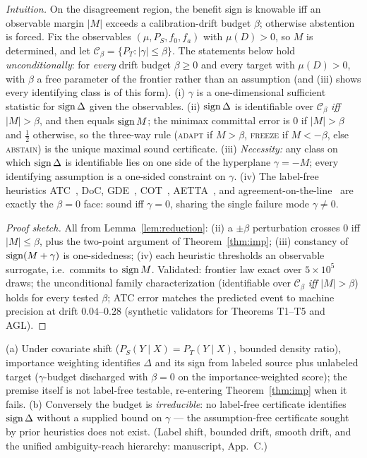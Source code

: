 \begin{theorem}\label{thm:frontier}
\emph{Intuition.} On the disagreement region, the benefit sign is knowable iff an observable
margin $|M|$ exceeds a calibration-drift budget $\beta$; otherwise abstention is forced.
Fix the observables $(\mu,P_S,f_0,f_a)$ with $\mu(D)>0$, so $M$ is determined, and let
$\mathcal C_\beta=\{P_T:|\gamma|\le\beta\}$. The statements below hold \emph{unconditionally}:
for \emph{every} drift budget $\beta\ge0$ and every target with $\mu(D)>0$, with $\beta$ a free
parameter of the frontier rather than an assumption (and (iii) shows every identifying class is
of this form).
\textnormal{(i)} $\gamma$ is a one-dimensional sufficient statistic for $\operatorname{sign}\Delta$
given the observables.
\textnormal{(ii)} $\operatorname{sign}\Delta$ is identifiable over $\mathcal C_\beta$ \emph{iff}
$|M|>\beta$, and then equals $\operatorname{sign} M$; the minimax committal error is $0$ if
$|M|>\beta$ and $\tfrac12$ otherwise, so the three-way rule (\textsc{adapt} if
$M>\beta$, \textsc{freeze} if $M<-\beta$, else \textsc{abstain}) is the unique maximal
sound certificate.
\textnormal{(iii)} \emph{Necessity:} any class on which $\operatorname{sign}\Delta$ is identifiable
lies on one side of the hyperplane $\gamma=-M$; every identifying assumption is a
one-sided constraint on $\gamma$.
\textnormal{(iv)} The label-free heuristics ATC~\cite{garg2022atc}, DoC,
GDE~\cite{jiang2022gde}, COT~\cite{lu2023cot},
AETTA~\cite{lee2024aetta}, and agreement-on-the-line~\cite{baek2022aol,kim2024taol} are
exactly the $\beta{=}0$ face: sound iff $\gamma=0$, sharing the single failure mode
$\gamma\neq0$.
\end{theorem}
\begin{proof}[Proof sketch]
All from Lemma~\ref{lem:reduction}: (ii) a $\pm\beta$ perturbation crosses $0$ iff
$|M|\le\beta$, plus the two-point argument of Theorem~\ref{thm:imp}; (iii) constancy of
$\operatorname{sign}(M+\gamma)$ is one-sidedness; (iv) each heuristic thresholds an observable
surrogate, i.e.\ commits to $\operatorname{sign} M$. Validated: frontier law exact over $5\times10^5$
draws; the unconditional family characterization (identifiable over $\mathcal C_\beta$ \emph{iff}
$|M|>\beta$) holds for every tested $\beta$; ATC error matches the predicted event to machine
precision at drift $0.04$--$0.28$ (synthetic validators for Theorems T1--T5 and AGL).
\end{proof}

\begin{corollary}\label{thm:pos}\label{cor:irreducible}
\textnormal{(a)} Under covariate shift ($P_S(Y{\mid}X)=P_T(Y{\mid}X)$, bounded density
ratio), importance weighting identifies $\Delta$ and its sign from labeled source plus
unlabeled target ($\gamma$-budget discharged with $\beta=0$ on the importance-weighted
score); the premise itself is not label-free testable, re-entering
Theorem~\ref{thm:imp} when it fails. \textnormal{(b)} Conversely the budget is
\emph{irreducible}: no label-free certificate identifies $\operatorname{sign}\Delta$ without a
supplied bound on $\gamma$ --- the assumption-free certificate sought by prior
heuristics does not exist. (Label shift, bounded drift, smooth drift, and the unified
ambiguity-reach hierarchy: manuscript, App.~C.)
\end{corollary}

